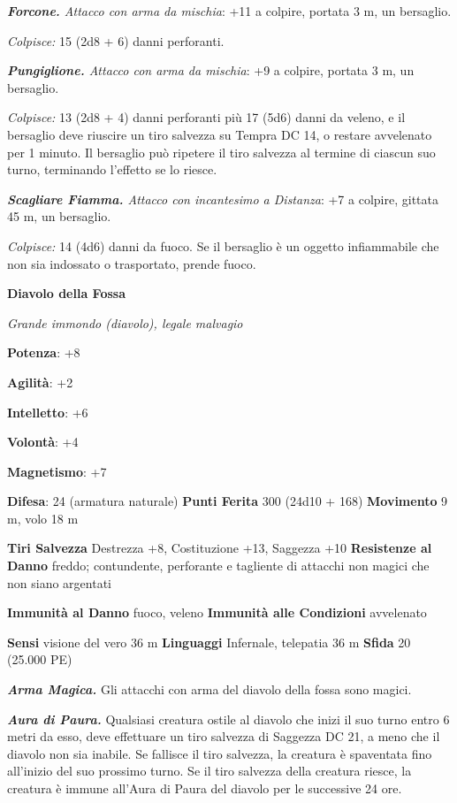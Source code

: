 \begin{multicols}{2}
\emph{\textbf{Forcone.} Attacco con arma da mischia}: +11 a colpire,
portata 3 m, un bersaglio.

\emph{Colpisce:} 15 (2d8 + 6) danni perforanti.

\emph{\textbf{Pungiglione.} Attacco con arma da mischia}: +9 a colpire,
portata 3 m, un bersaglio.

\emph{Colpisce:} 13 (2d8 + 4) danni perforanti più 17 (5d6) danni da
veleno, e il bersaglio deve riuscire un tiro salvezza su Tempra DC
14, o restare avvelenato per 1 minuto. Il bersaglio può ripetere il tiro
salvezza al termine di ciascun suo turno, terminando l'effetto se lo
riesce.

\emph{\textbf{Scagliare Fiamma.} Attacco con incantesimo a Distanza}: +7
a colpire, gittata 45 m, un bersaglio.

\emph{Colpisce:} 14 (4d6) danni da fuoco. Se il bersaglio è un oggetto
infiammabile che non sia indossato o trasportato, prende fuoco.

\textbf{Diavolo della Fossa}

\emph{Grande immondo (diavolo), legale malvagio}

\textbf{Potenza}: +8

\textbf{Agilità}: +2

\textbf{Intelletto}: +6

\textbf{Volontà}: +4

\textbf{Magnetismo}: +7

\textbf{Difesa}: 24 (armatura naturale) \textbf{Punti Ferita}
300 (24d10 + 168) \textbf{Movimento} 9 m, volo 18 m

\textbf{Tiri Salvezza} Destrezza +8, Costituzione +13, Saggezza +10
\textbf{Resistenze al Danno} freddo; contundente, perforante e tagliente
di attacchi non magici che non siano argentati

\textbf{Immunità al Danno} fuoco, veleno \textbf{Immunità alle
Condizioni} avvelenato

\textbf{Sensi} visione del vero 36 m
\textbf{Linguaggi} Infernale, telepatia 36 m \textbf{Sfida} 20 (25.000
PE)

\emph{\textbf{Arma Magica.}} Gli attacchi con arma del diavolo della
fossa sono magici.

\emph{\textbf{Aura di Paura.}} Qualsiasi creatura ostile al diavolo che
inizi il suo turno entro 6 metri da esso, deve effettuare un tiro
salvezza di Saggezza DC 21, a meno che il diavolo non sia inabile. Se
fallisce il tiro salvezza, la creatura è spaventata fino all'inizio del
suo prossimo turno. Se il tiro salvezza della creatura riesce, la
creatura è immune all'Aura di Paura del diavolo per le successive 24
ore.


\end{multicols}
